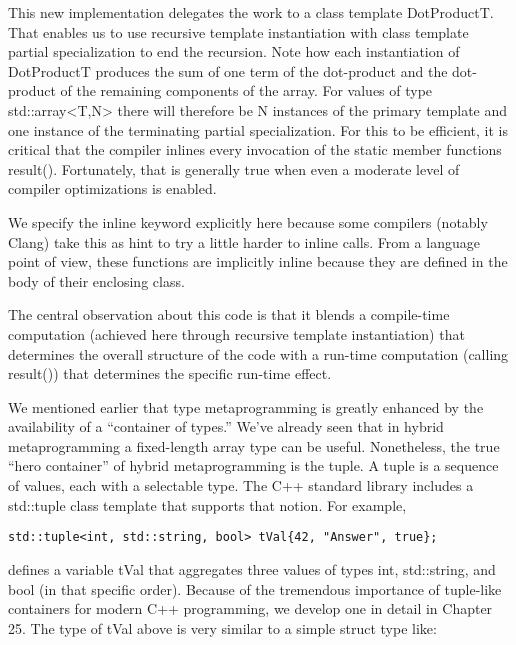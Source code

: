 This new implementation delegates the work to a class template DotProductT. That enables us to use recursive template instantiation with class template partial specialization to end the recursion. Note how each instantiation of DotProductT produces the sum of one term of the dot-product and the dot-product of the remaining components of the array. For values of type std::array<T,N> there will therefore be N instances of the primary template and one instance of the terminating partial specialization. For this to be efficient, it is critical that the compiler inlines every invocation of the static member functions result(). Fortunately, that is generally true when even a moderate level of compiler optimizations is enabled.

\begin{tcolorbox}[colback=webgreen!5!white,colframe=webgreen!75!black]
\hspace*{0.75cm}We specify the inline keyword explicitly here because some compilers (notably Clang) take this as hint to try a little harder to inline calls. From a language point of view, these functions are implicitly inline because they are defined in the body of their enclosing class.
\end{tcolorbox}

The central observation about this code is that it blends a compile-time computation (achieved here through recursive template instantiation) that determines the overall structure of the code with a run-time computation (calling result()) that determines the specific run-time effect.

We mentioned earlier that type metaprogramming is greatly enhanced by the availability of a “container of types.” We’ve already seen that in hybrid metaprogramming a fixed-length array type can be useful. Nonetheless, the true “hero container” of hybrid metaprogramming is the tuple. A tuple is a sequence of values, each with a selectable type. The C++ standard library includes a std::tuple class template that supports that notion. For example,

\begin{lstlisting}[style=styleCXX]
std::tuple<int, std::string, bool> tVal{42, "Answer", true};
\end{lstlisting}

defines a variable tVal that aggregates three values of types int, std::string, and bool (in that specific order). Because of the tremendous importance of tuple-like containers for modern C++ programming, we develop one in detail in Chapter 25. The type of tVal above is very similar to a simple struct type like:

